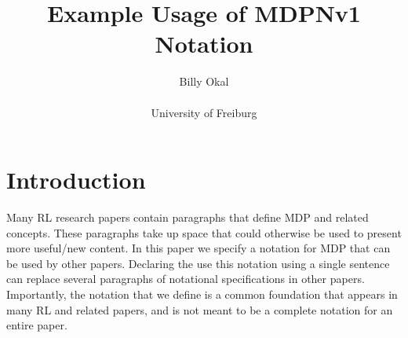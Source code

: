 \documentclass[a4paper]{article}
\author{Billy Okal\\\\
University of Freiburg}
\title{\bf \sffamily Example Usage of MDPNv1 Notation}
\date{}
\begin{document}
\maketitle


\section{Introduction}
\label{sec:intro}
Many \gls{RL} research papers contain paragraphs that define \gls{MDP} and related concepts.
These paragraphs take up space that could otherwise be used to present more useful/new content.
In this paper we specify a notation for \gls{MDP} that can be used by other papers. Declaring the use this notation using a single sentence can replace several paragraphs of notational specifications in other papers.
Importantly, the notation that we define is a common foundation that appears in many \gls{RL} and related papers, and is not meant to be a complete notation for an entire paper.
\end{document}
